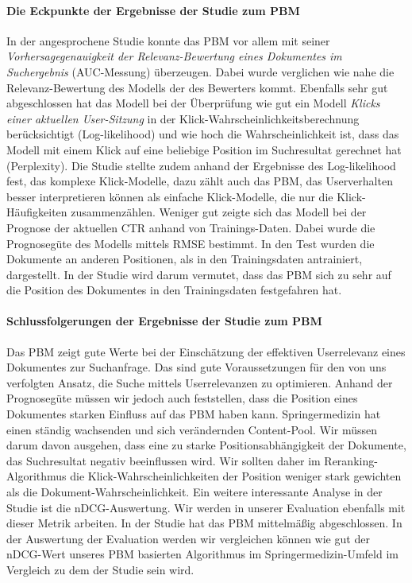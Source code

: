 \paragraph{Die Eckpunkte der Ergebnisse der Studie zum PBM}
In der angesprochene Studie \cite{pbm} konnte das PBM vor allem mit seiner \textit{Vorhersagegenauigkeit der Relevanz-Bewertung eines Dokumentes im Suchergebnis} (AUC-Messung) überzeugen. Dabei wurde verglichen wie nahe die Relevanz-Bewertung des Modells der des Bewerters kommt. Ebenfalls sehr gut abgeschlossen hat das Modell bei der Überprüfung wie gut ein Modell \textit{Klicks einer aktuellen User-Sitzung} in der Klick-Wahrscheinlichkeitsberechnung berücksichtigt (Log-likelihood) und wie hoch die Wahrscheinlichkeit ist, dass das Modell mit einem Klick auf eine beliebige Position im Suchresultat gerechnet hat (Perplexity). Die Studie stellte zudem anhand der Ergebnisse des Log-likelihood fest, das komplexe Klick-Modelle, dazu zählt auch das PBM, das Userverhalten besser interpretieren können als einfache Klick-Modelle, die nur die Klick-Häufigkeiten zusammenzählen. Weniger gut zeigte sich das Modell bei der Prognose der aktuellen CTR anhand von Trainings-Daten. Dabei wurde die Prognosegüte des Modells mittels RMSE bestimmt. In den Test wurden die Dokumente an anderen Positionen, als in den Trainingsdaten antrainiert, dargestellt. In der Studie wird darum vermutet, dass das PBM sich zu sehr auf die Position des Dokumentes in den Trainingsdaten festgefahren hat.

\paragraph{Schlussfolgerungen der Ergebnisse der Studie zum PBM}
Das PBM zeigt gute Werte bei der Einschätzung der effektiven Userrelevanz eines Dokumentes zur Suchanfrage. Das sind gute Voraussetzungen für den von uns verfolgten Ansatz, die Suche mittels Userrelevanzen zu optimieren. Anhand der Prognosegüte müssen wir jedoch auch feststellen, dass die Position eines Dokumentes starken Einfluss auf das PBM haben kann. Springermedizin hat einen ständig wachsenden und sich verändernden Content-Pool. Wir müssen darum davon ausgehen, dass eine zu starke Positionsabhängigkeit der Dokumente, das Suchresultat negativ beeinflussen wird. Wir sollten daher im Reranking-Algorithmus die Klick-Wahrscheinlichkeiten der Position weniger stark gewichten als die Dokument-Wahrscheinlichkeit. Ein weitere interessante Analyse in der Studie ist die nDCG-Auswertung. Wir werden in unserer Evaluation ebenfalls mit dieser Metrik arbeiten. In der Studie hat das PBM mittelmäßig abgeschlossen. In der Auswertung der Evaluation werden wir vergleichen können wie gut der nDCG-Wert unseres PBM basierten Algorithmus im Springermedizin-Umfeld im Vergleich zu dem der Studie sein wird.

